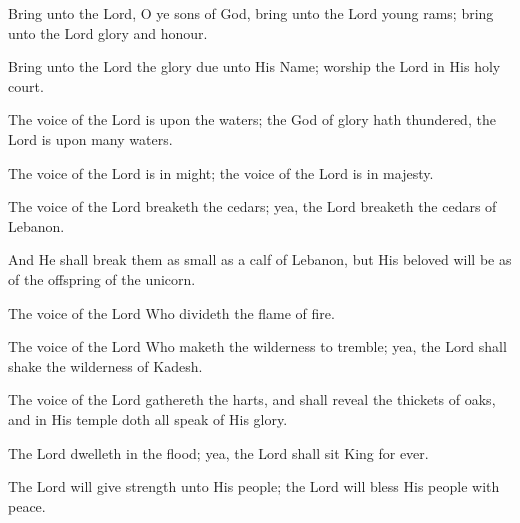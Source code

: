 Bring unto the Lord, O ye sons of God, bring unto the Lord young rams; bring unto the Lord glory and honour.

Bring unto the Lord the glory due unto His Name; worship the Lord in His holy court.

The voice of the Lord is upon the waters; the God of glory hath thundered, the Lord is upon many waters.

The voice of the Lord is in might; the voice of the Lord is in majesty.

The voice of the Lord breaketh the cedars; yea, the Lord breaketh the cedars of Lebanon.

And He shall break them as small as a calf of Lebanon, but His beloved will be as of the offspring of the unicorn.

The voice of the Lord Who divideth the flame of fire.

The voice of the Lord Who maketh the wilderness to tremble; yea, the Lord shall shake the wilderness of Kadesh.

The voice of the Lord gathereth the harts, and shall reveal the thickets of oaks, and in His temple doth all speak of His glory.

The Lord dwelleth in the flood; yea, the Lord shall sit King for ever.

The Lord will give strength unto His people; the Lord will bless His people with peace.

